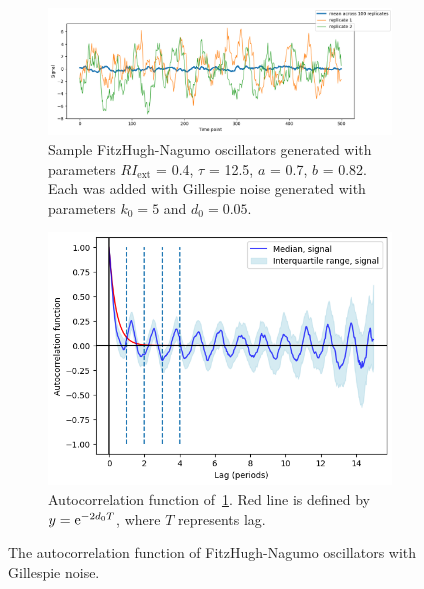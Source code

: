 \begin{figure}
  \centering
  \begin{subfigure}[t]{0.7\textwidth}
  \centering
    \includegraphics[width=\linewidth]{fhn_meanplot}
    \caption{
      Sample FitzHugh-Nagumo oscillators generated with parameters $RI_{\mathrm{ext}}$ = 0.4, $\tau$ = 12.5, $a$ = 0.7, $b$ = 0.82.
      Each was added with Gillespie noise generated with parameters $k_{0} = 5$ and $d_{0} = 0.05$.
    }
    \label{fig:acf-fhn-gillnoise-ts}
  \end{subfigure}

  \begin{subfigure}[t]{0.6\textwidth}
  \centering
    \includegraphics[width=\linewidth]{fhn_acf}
    \caption{
      Autocorrelation function of~\ref{fig:acf-fhn-gillnoise-ts}.
      Red line is defined by $y = \mathrm{e}^{-2d_{0}T}$, where $T$ represents lag.
    }
    \label{fig:acf-fhn-gillnoise-acf}
  \end{subfigure}

  \caption{
    The autocorrelation function of FitzHugh-Nagumo oscillators with Gillespie noise.
  }
  \label{fig:acf-fhn}
\end{figure}

